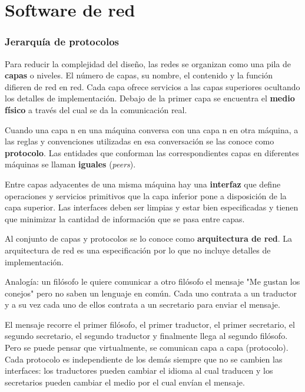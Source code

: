\documentclass{book}
\begin{document}
	\section{Software de red}
	
	\subsubsection{Jerarquía de protocolos}
	Para reducir la complejidad del diseño, las redes se organizan como una pila de \textbf{capas} o niveles. El número de capas, su nombre, el contenido y la función difieren de red en red. Cada capa ofrece servicios a las capas superiores ocultando los detalles de implementación. Debajo de la primer capa se encuentra el \textbf{medio físico} a través del cual se da la comunicación real.
	
	\vspace{3mm}
	Cuando una capa n en una máquina conversa con una capa n en otra máquina, a las reglas y convenciones utilizadas en esa conversación se las conoce como \textbf{protocolo}. Las entidades que conforman las correspondientes capas en diferentes máquinas se llaman \textbf{iguales} (\textit{peers}).
	
	\vspace{3mm}
	Entre capas adyacentes de una misma máquina hay una \textbf{interfaz} que define operaciones y servicios primitivos que la capa inferior pone a disposición de la capa superior. Las interfaces deben ser limpias y estar bien especificadas y tienen que minimizar la cantidad de información que se pasa entre capas.
	
	\vspace{3mm}
	Al conjunto de capas y protocolos se lo conoce como \textbf{arquitectura de red}. La arquitectura de red es una especificación por lo que no incluye detalles de implementación.
	
	\vspace{3mm}
	Analogía: un filósofo le quiere comunicar a otro filósofo el mensaje "Me gustan los conejos" pero no saben un lenguaje en común. Cada uno contrata a un traductor y a su vez cada uno de ellos contrata a un secretario para enviar el mensaje.
	
	El mensaje recorre el primer filósofo, el primer traductor, el primer secretario, el segundo secretario, el segundo traductor y finalmente llega al segundo filósofo. Pero se puede pensar que virtualmente, se comunican capa a capa (protocolo). Cada protocolo es independiente de los demás siempre que no se cambien las interfaces: los traductores pueden cambiar el idioma al cual traducen y los secretarios pueden cambiar el medio por el cual envían el mensaje.
	
\end{document}
